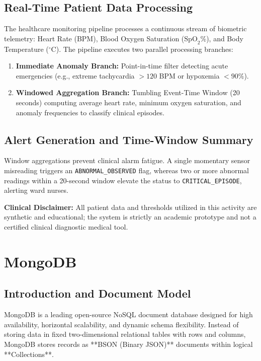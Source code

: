 \documentclass[12pt,a4paper]{report}
\begin{document}
\subsection{Real-Time Patient Data Processing}
The healthcare monitoring pipeline processes a continuous stream of biometric telemetry: Heart Rate (BPM), Blood Oxygen Saturation ($\text{SpO}_2$\%), and Body Temperature ($^\circ$C). The pipeline executes two parallel processing branches:
\begin{enumerate}
    \item \textbf{Immediate Anomaly Branch:} Point-in-time filter detecting acute emergencies (e.g., extreme tachycardia $>120$ BPM or hypoxemia $<90\%$).
    \item \textbf{Windowed Aggregation Branch:} Tumbling Event-Time Window (20 seconds) computing average heart rate, minimum oxygen saturation, and anomaly frequencies to classify clinical episodes.
\end{enumerate}

\subsection{Alert Generation and Time-Window Summary}
Window aggregations prevent clinical alarm fatigue. A single momentary sensor misreading triggers an \texttt{ABNORMAL\_OBSERVED} flag, whereas two or more abnormal readings within a 20-second window elevate the status to \texttt{CRITICAL\_EPISODE}, alerting ward nurses.

\noindent\textbf{Clinical Disclaimer:} All patient data and thresholds utilized in this activity are synthetic and educational; the system is strictly an academic prototype and not a certified clinical diagnostic medical tool.

\section{MongoDB}
\subsection{Introduction and Document Model}
MongoDB is a leading open-source NoSQL document database designed for high availability, horizontal scalability, and dynamic schema flexibility. Instead of storing data in fixed two-dimensional relational tables with rows and columns, MongoDB stores records as **BSON (Binary JSON)** documents within logical **Collections**.
\end{document}
